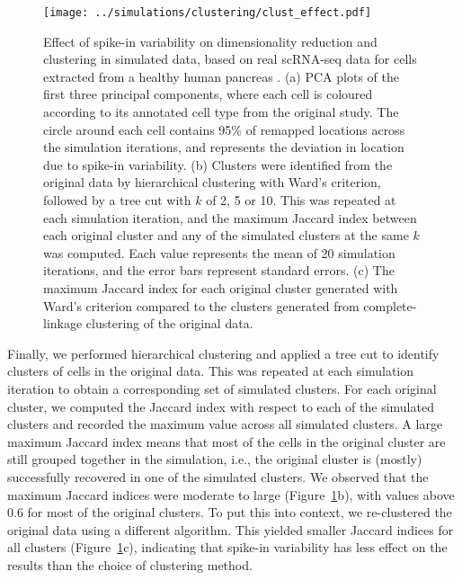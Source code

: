 \documentclass{article}
\begin{document}
\begin{figure}[btp]
    \begin{center}
        \texttt{[image: ../simulations/clustering/clust\_effect.pdf]}
    \end{center}
    \caption{Effect of spike-in variability on dimensionality reduction and clustering in simulated data,
        based on real scRNA-seq data for cells extracted from a healthy human pancreas \cite{segerstople2016single}.
        (a) PCA plots of the first three principal components, where each cell is coloured according to its annotated cell type from the original study. 
        The circle around each cell contains 95\% of remapped locations across the simulation iterations, and represents the deviation in location due to spike-in variability.
        (b) Clusters were identified from the original data by hierarchical clustering with Ward's criterion, followed by a tree cut with $k$ of 2, 5 or 10.
        This was repeated at each simulation iteration, and the maximum Jaccard index between each original cluster and any of the simulated clusters at the same $k$ was computed.
        Each value represents the mean of 20 simulation iterations, and the error bars represent standard errors.
        (c) The maximum Jaccard index for each original cluster generated with Ward's criterion compared to the clusters generated from complete-linkage clustering of the original data.
    }
    \label{fig:dimclust}
\end{figure}

Finally, we performed hierarchical clustering and applied a tree cut to identify clusters of cells in the original data.
This was repeated at each simulation iteration to obtain a corresponding set of simulated clusters.
For each original cluster, we computed the Jaccard index with respect to each of the simulated clusters and recorded the maximum value across all simulated clusters.
A large maximum Jaccard index means that most of the cells in the original cluster are still grouped together in the simulation,
i.e., the original cluster is (mostly) successfully recovered in one of the simulated clusters.
We observed that the maximum Jaccard indices were moderate to large (Figure~\ref{fig:dimclust}b), with values above 0.6 for most of the original clusters.
To put this into context, we re-clustered the original data using a different algorithm.
This yielded smaller Jaccard indices for all clusters (Figure~\ref{fig:dimclust}c), indicating that spike-in variability has less effect on the results than the choice of clustering method.
\end{document}
